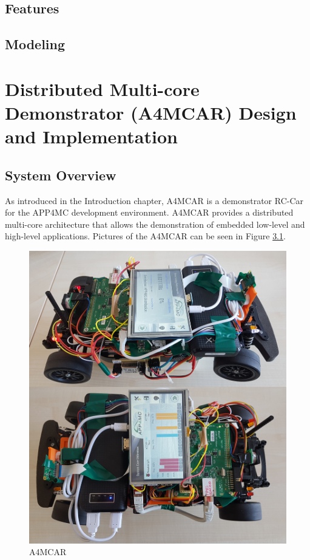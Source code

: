 \section{Features}
\section{Modeling}
\chapter{Distributed Multi-core Demonstrator (A4MCAR) Design and Implementation}
\section{System Overview}
As introduced in the Introduction chapter, A4MCAR is a demonstrator RC-Car for the APP4MC development environment. A4MCAR provides a distributed multi-core architecture that allows the demonstration of embedded low-level and high-level applications. Pictures of the A4MCAR can be seen in Figure \ref{fig:a4mcar}.
\begin{figure}[!ht]
	\includegraphics[scale=0.4]{content/images/a4mcar.png}
	\caption{A4MCAR}
	\label{fig:a4mcar}
\end{figure}
